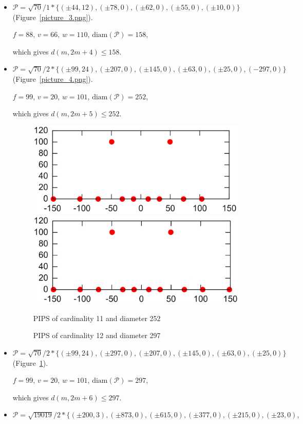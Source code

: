 \documentclass[12pt]{article}
\theoremstyle{theorem}
\theoremstyle{dfn}
\theoremstyle{remark}
\begin{document}
\begin{itemize}
\item
$\mathcal{P}=\sqrt{70}/{1} * \{ (\pm 44, 12),
(\pm 78 , 0),
(\pm 62, 0),
(\pm 55 , 0),
(\pm 10 , 0)\}
$
(Figure~\ref{picture_3.png}).

$f = 88$, $v = 66$, $w = 110$, $\operatorname{diam(\mathcal{P})} = 158$,

which gives $d(m, 2m + 4) \leq 158$.


\item
$\mathcal{P}=\sqrt{70}/{2} * \{ (\pm 99, 24),
(\pm 207 , 0),
(\pm 145 , 0),
(\pm 63 , 0),
(\pm 25 , 0),
(-297 , 0)\}
$
(Figure~\ref{picture_4.png}).

$f = 99$, $v = 20$, $w = 101$, $\operatorname{diam(\mathcal{P})} = 252$,

which gives $d(m, 2m + 5) \leq 252$.


\begin{figure}[htbp]
	\includegraphics[width=.48\linewidth]{picture_4.png}
	\hfill
	\includegraphics[width=.48\linewidth]{picture_5.png}
	\\
	\parbox{.48\linewidth}{\caption{PIPS of cardinality 11 and diameter 252}
	\label{picture_4.png}}
	\hfill
	\parbox{.48\linewidth}{\caption{PIPS of cardinality 12 and diameter 297}
	\label{picture_5.png}}
\end{figure}


\item
$\mathcal{P}=\sqrt{70}/{2} * \{ (\pm 99, 24),
(\pm 297 , 0),
(\pm 207 , 0),
(\pm 145 , 0),
(\pm 63 , 0),
(\pm 25 , 0)\}
$
(Figure~\ref{picture_5.png}).

$f = 99$, $v = 20$, $w = 101$, $\operatorname{diam(\mathcal{P})} = 297$,

which gives $d(m, 2m + 6) \leq 297$.


\item
$\mathcal{P}=\sqrt{19019}/{2} * \{ (\pm 200, 3),
(\pm 873 , 0),
(\pm 615 , 0),
(\pm 377 , 0),
(\pm 215 , 0),
(\pm 23 , 0),
$


\end{itemize}
\end{document}

